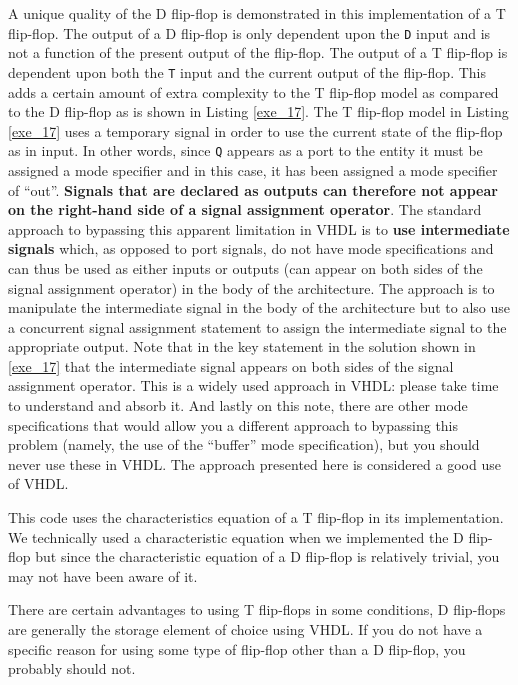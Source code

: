 \begin{my_list}
\item A unique quality of the D flip-flop is demonstrated in this implementation of a T flip-flop. The output of a D flip-flop is only dependent upon the \texttt{D} input and is not a function of the present output of the flip-flop. The output of a T flip-flop is dependent upon both the \texttt{T} input and the current output of the flip-flop. This adds a certain amount of extra complexity to the T flip-flop model as compared to the D flip-flop as is shown in Listing \ref{exe_17}. The T flip-flop model in Listing \ref{exe_17} uses a temporary signal in order to use the current state of the flip-flop as in input. In other words, since \texttt{Q} appears as a port to the entity it must be assigned a mode specifier and in this case, it has been assigned a mode specifier of ``out''. \textbf{Signals that are declared as outputs can therefore not appear on the right-hand side of a signal assignment operator}. The standard approach to bypassing this apparent limitation in VHDL is to \textbf{use intermediate signals} which, as opposed to port signals, do not have mode specifications and can thus be used as either inputs or outputs (can appear on both sides of the signal assignment operator) in the body of the architecture. The approach is to manipulate the intermediate signal in the body of the architecture but to also use a concurrent signal assignment statement to assign the intermediate signal to the appropriate output. Note that in the key statement in the solution shown in \ref{exe_17} that the intermediate signal appears on both sides of the signal assignment operator. This is a widely used approach in VHDL: please take time to understand and absorb it. And lastly on this note, there are other mode specifications that would allow you a different approach to bypassing this problem (namely, the use of the ``buffer'' mode specification), but you should never use these in VHDL. The approach presented here is considered a good use of VHDL. 

\item This code uses the characteristics equation of a T flip-flop in its implementation. We technically used a characteristic equation when we implemented the D flip-flop but since the characteristic equation of a D flip-flop is relatively trivial, you may not have been aware of it.
\item There are certain advantages to using T flip-flops in some conditions, D flip-flops are generally the storage element of choice using VHDL. If you do not have a specific reason for using some type of flip-flop other than a D flip-flop, you probably should not. 
\end{my_list}

